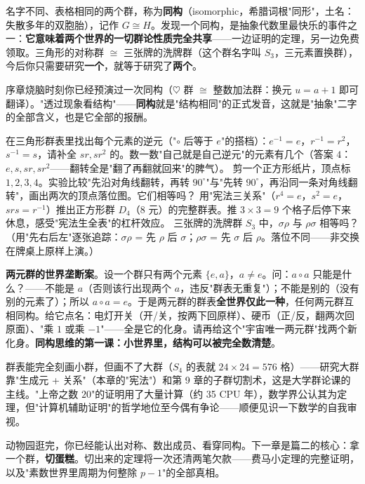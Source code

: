 \begin{faming}
名字不同、表格相同的两个群，称为\textbf{同构}（isomorphic，希腊词根"同形"，土名：失散多年的双胞胎），记作 $G \cong H$。发现一个同构，是抽象代数里最快乐的事件之一：\textbf{它意味着两个世界的一切群论性质完全共享}——一边证明的定理，另一边免费领取。三角形的对称群 $\cong$ 三张牌的洗牌群（这个群名字叫 $S_3$，三元素置换群），今后你只需要研究\textbf{一个}，就等于研究了\textbf{两个}。
\end{faming}

序章烧脑时刻你已经预演过一次同构（$\heartsuit$ 群 $\cong$ 整数加法群：换元 $u = a+1$ 即可翻译）。"透过现象看结构"——\textbf{同构}就是"结构相同"的正式发音，这就是"抽象"二字的全部含义，也是它全部的报酬。

\begin{dongshou}
\begin{itemize}
  \yisi 在三角形群表里找出每个元素的逆元（"$\circ$ 后等于 $e$"的搭档）：$e^{-1} = e$，$r^{-1} = r^2$，$s^{-1} = s$，请补全 $sr, sr^2$ 的。数一数"自己就是自己逆元"的元素有几个（答案 $4$：$e, s, sr, sr^2$——翻转全是"翻了再翻就回来"的脾气）。
  \yier 剪一个正方形纸片，顶点标 $1,2,3,4$。实验比较"先沿对角线翻转，再转 $90^\circ$"与"先转 $90^\circ$，再沿同一条对角线翻转"，画出两次的顶点落位图。它们相等吗？
  \yier 用"宪法三关系"（$r^4 = e$，$s^2 = e$，$srs = r^{-1}$）推出正方形群 $D_4$（$8$ 元）的完整群表。推 $3\times3 = 9$ 个格子后停下来休息，感受"宪法生全表"的杠杆效应。
  \yier 三张牌的洗牌群 $S_3$ 中，$\sigma\rho$ 与 $\rho\sigma$ 相等吗？（用"先右后左"逐张追踪：$\sigma\rho$ = 先 $\rho$ 后 $\sigma$；$\rho\sigma$ = 先 $\sigma$ 后 $\rho$。落位不同——非交换在牌桌上原样上演。）
\end{itemize}
\end{dongshou}

\begin{shaonao}
\textbf{两元群的世界垄断案}。设一个群只有两个元素 $\{e, a\}$，$a \ne e$。问：$a\circ a$ 只能是什么？——不能是 $a$（否则该行出现两个 $a$，违反"群表无重复"）；不能是别的（没有别的元素了）；所以 $a\circ a = e$。于是两元群的群表\textbf{全世界仅此一种}，任何两元群互相同构。给它点名：电灯开关（开/关，按两下回原样）、硬币（正/反，翻两次回原面）、"乘 $1$ 或乘 $-1$"——全是它的化身。请再给这个"宇宙唯一两元群"找两个新化身。\textbf{同构思维的第一课：小世界里，结构可以被完全数清楚}。
\end{shaonao}

\begin{chengshi}
群表能完全刻画小群，但画不了大群（$S_4$ 的表就 $24\times24 = 576$ 格）——研究大群靠"生成元 + 关系"（本章的"宪法"）和第 9 章的子群切割术，这是大学群论课的主线。"上帝之数 $20$"的证明用了大量计算（约 35 CPU 年），数学界公认其为定理，但"计算机辅助证明"的哲学地位至今偶有争论——顺便见识一下数学的自我审视。
\end{chengshi}

动物园逛完，你已经能认出对称、数出成员、看穿同构。下一章是篇二的核心：拿一个群，\textbf{切蛋糕}。切出来的定理将一次还清两笔欠款——费马小定理的完整证明，以及"素数世界里周期为何整除 $p-1$"的全部真相。
